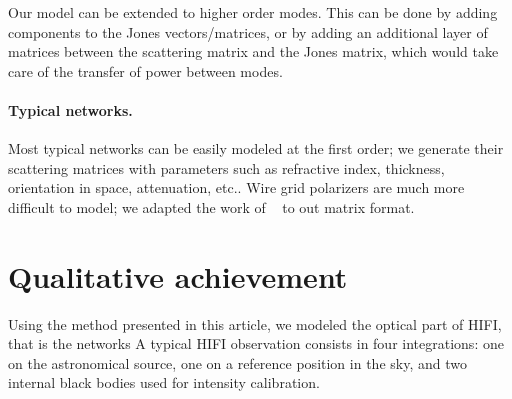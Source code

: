 \documentclass[a4paper,11pt]{article}
\begin{document}
Our model can be extended to higher order modes.
This can be done by adding components to the Jones vectors/matrices, or by adding an additional layer of matrices between the scattering matrix and the Jones matrix, which would take care of the transfer of power between modes.


\paragraph{Typical networks.}
Most typical networks can be easily modeled at the first order;
we generate their scattering matrices with parameters such as refractive index, thickness, orientation in space, attenuation, etc..
Wire grid polarizers are much more difficult to model; we adapted the work of \citeauthor{houde_2001}~\cite{houde_2001} to out matrix format.




\section{Qualitative achievement}

Using the method presented in this article, we modeled the optical part of HIFI, that is the networks 
A typical HIFI observation consists in four integrations: one on the astronomical source, one on a reference position in the sky, and two internal black bodies used for intensity calibration.
\end{document}
